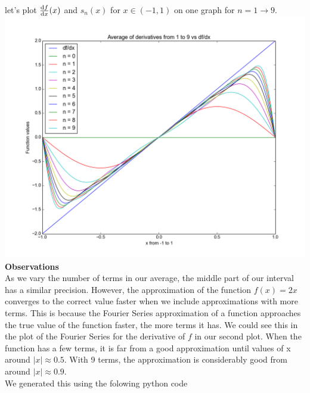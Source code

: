 \documentclass[12pt]{article}
\newcommand{\dfdx}{\frac{{\rm d}f}{{\rm d}x}}
\begin{document}
let's plot $\dfdx(x)$ and $s_n(x)$ for $x \in (-1, 1)$ on one graph for $n = 1 \rightarrow 9$.\\
\hspace{-3em}
\includegraphics[scale=0.6]{average.png}
\textbf{Observations}\\
As we vary the number of terms in our average, the middle part of our interval has a similar precision. However, the approximation
of the function $f(x) = 2x$ converges to the correct value faster when we include approximations with more terms. This is because
the Fourier Series approximation of a function approaches the true value of the function faster, the more terms it has. We could see
this in the plot of the Fourier Series for the derivative of $f$ in our second plot. When the function has a few terms, it is far from a
good approximation until values of x around $|x| \approx 0.5$. With 9 terms, the approximation is considerably good from around $|x| \approx 0.9$.\\
We generated this using the folowing python code

\end{document}
